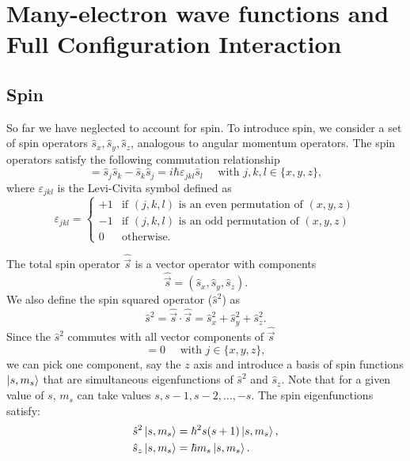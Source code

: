 \documentclass[../Main/chem532-notes.tex]{subfiles}
\begin{document}
\chapter[Many-electron wave functions]{Many-electron wave functions and Full Configuration Interaction}

\section{Spin}
So far we have neglected to account for spin.
To introduce spin, we consider a set of spin operators $\hat{s}_x, \hat{s}_y, \hat{s}_z$, analogous to angular momentum operators.
The spin operators satisfy the following commutation relationship
\begin{equation}
[\hat{s}_{j},\hat{s}_{k}] = \hat{s}_{j}\hat{s}_{k} - \hat{s}_{k}\hat{s}_{j}= i \hbar \varepsilon_{jkl} \hat{s}_{l} \quad \text{ with } j,k,l \in \{x,y,z\},
\end{equation}
where $\varepsilon_{jkl}$ is the Levi-Civita symbol defined as
\begin{equation}
\varepsilon_{jkl} = \begin{cases}
+1 & \text{if $(j,k,l)$ is an even permutation of $(x,y,z)$} \\
-1 & \text{if $(j,k,l)$ is an odd permutation of $(x,y,z)$} \\
0 & \text{otherwise}.
\end{cases}
\end{equation}

The total spin operator $\hat{\vec{s}}$ is a vector operator with components
\begin{equation}
\hat{\vec{s}} = (\hat{s}_x, \hat{s}_y, \hat{s}_z).
\end{equation}
We also define the spin squared operator ($\hat{s}^2$) as
\begin{equation}
\hat{s}^2 = \hat{\vec{s}} \cdot \hat{\vec{s}} = \hat{s}_x^2 + \hat{s}_y^2 + \hat{s}_z^2.
\end{equation}
Since the $\hat{s}^2$ commutes with all vector components of $\hat{\vec{s}}$
\begin{equation}
[\hat{s}^2,\hat{s}_j] = 0 \quad \text{ with } j \in \{x,y,z\},
\end{equation}
we can pick one component, say the $z$ axis and introduce a basis of spin functions $\ket{s,m_s}$ that are simultaneous eigenfunctions of $\hat{s}^2$ and $\hat{s}_z$. Note that for a given value of $s$, $m_s$ can take values $s, s -1, s-2, \ldots, -s$.
The spin eigenfunctions satisfy:
\begin{align}
\hat{s}^2 \ket{s,m_s} &= \hbar^2 s(s+1) \ket{s,m_s}, \\
\hat{s}_z \ket{s,m_s} &= \hbar m_s \ket{s,m_s}.
\end{align}
\end{document}
